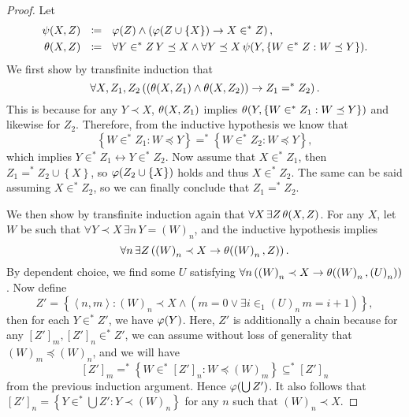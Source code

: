 \documentclass[11pt]{article}
\theoremstyle{plain}
\theoremstyle{definition}
\newcommand{\tuple}[1]{\left\langle #1 \right\rangle}
\begin{document}
\begin{proof}
    Let
    \begin{align*}
        \psi\mleft(X, Z\mright) \ \    & \coloneqq \ \ \varphi\mleft(Z\mright) \land \left(\varphi\mleft(Z \cup \left\{X\right\}\mright) \rightarrow X \in^* Z\right),             \\
        \theta\mleft(X, Z\mright) \ \  & \coloneqq \ \ \forall Y \in^* Z \, Y \preceq X \land \forall Y \preceq X \, \psi\mleft(Y, \left\{W \in^* Z : W \preceq Y\right\}\mright).
    \end{align*}
    We first show by transfinite induction that
    \[\forall X, Z_1, Z_2 \left(\left(\theta\mleft(X, Z_1\mright) \land \theta\mleft(X, Z_2\mright)\right) \rightarrow Z_1 =^* Z_2\right).\]
    This is because for any $Y \prec X$, $\theta\mleft(X, Z_1\mright)$ implies $\theta\mleft(Y, \left\{W \in^* Z_1 : W \preceq Y\right\}\mright)$ and likewise for $Z_2$. Therefore, from the inductive hypothesis we know that
    \[\left\{W \in^* Z_1 : W \preceq Y\right\} =^* \left\{W \in^* Z_2 : W \preceq Y\right\},\]
    which implies $Y \in^* Z_1 \leftrightarrow Y \in^* Z_2$. Now assume that $X \in^* Z_1$, then $Z_1 =^* Z_2 \cup \left\{X\right\}$, so $\varphi\mleft(Z_2 \cup \left\{X\right\}\mright)$ holds and thus $X \in^* Z_2$. The same can be said assuming $X \in^* Z_2$, so we can finally conclude that $Z_1 =^* Z_2$.

    We then show by transfinite induction again that $\forall X \, \exists Z \, \theta\mleft(X, Z\mright)$. For any $X$, let $W$ be such that $\forall Y \prec X \, \exists n \, Y = \left(W\right)_n$, and the inductive hypothesis implies
    \[\forall n \, \exists Z \left(\left(W\right)_n \prec X \rightarrow \theta\mleft(\left(W\right)_n, Z\mright)\right).\]
    By dependent choice, we find some $U$ satisfying $\forall n \left(\left(W\right)_n \prec X \rightarrow \theta\mleft(\left(W\right)_n, \left(U\right)_n\mright)\right)$. Now define
    \[Z' = \left\{\tuple{n, m} : \left(W\right)_n \prec X \land \left(m = 0 \lor \exists i \in_1 \left(U\right)_n \, m = i + 1\right)\right\},\]
    then for each $Y \in^* Z'$, we have $\varphi\mleft(Y\mright)$. Here, $Z'$ is additionally a chain because for any $\left[Z'\right]_m, \left[Z'\right]_n \in^* Z'$, we can assume without loss of generality that $\left(W\right)_m \preceq \left(W\right)_n$, and we will have
    \[\left[Z'\right]_m =^* \left\{W \in^* \left[Z'\right]_n : W \preceq \left(W\right)_m\right\} \subseteq^* \left[Z'\right]_n\]
    from the previous induction argument. Hence $\varphi\mleft(\bigcup Z'\mright)$. It also follows that $\left[Z'\right]_n = \left\{Y \in^* \bigcup Z' : Y \prec \left(W\right)_n\right\}$ for any $n$ such that $\left(W\right)_n \prec X$.


\end{proof}
\end{document}
